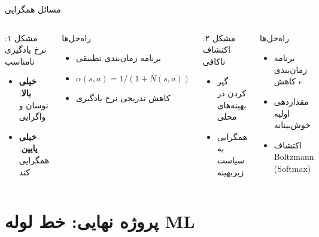 \documentclass[aspectratio=169]{beamer}
\begin{document}
\begin{frame}{مسائل همگرایی}
\begin{columns}
\begin{block}{مشکل ۱: نرخ یادگیری نامناسب}
\begin{itemize}
\item \textbf{خیلی بالا}: نوسان و واگرایی
\item \textbf{خیلی پایین}: همگرایی کند
\end{itemize}
\end{block}

\begin{block}{راه‌حل‌ها}
\begin{itemize}
\item برنامه زمان‌بندی تطبیقی
\item $\alpha(s,a) = 1/(1+N(s,a))$
\item کاهش تدریجی نرخ یادگیری
\end{itemize}
\end{block}

\begin{block}{مشکل ۲: اکتشاف ناکافی}
\begin{itemize}
\item گیر کردن در بهینه‌های محلی
\item همگرایی به سیاست زیربهینه
\end{itemize}
\end{block}

\begin{block}{راه‌حل‌ها}
\begin{itemize}
\item برنامه زمان‌بندی کاهش $\epsilon$
\item مقداردهی اولیه خوش‌بینانه
\item اکتشاف Boltzmann (Softmax)
\end{itemize}
\end{block}
\end{columns}
\end{frame}

\section{پروژه نهایی: خط لوله ML}
\end{document}
